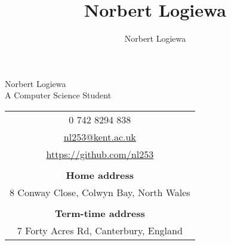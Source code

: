 \documentclass[a4paper, 13pt, draft]{article}
\author{Norbert Logiewa}
\title{Norbert Logiewa}
\begin{document}
\begin{center} \Huge{Norbert Logiewa} \\ \small{A Computer Science Student}  \end{center}

    \begin{table}[htpb]
	\centering
	\begin{tabular}{c}

	    0 742 8294 838 \\

	    \href{mailto:nl253@kent.ac.uk}{nl253@kent.ac.uk} \\

	    \href{https://github.com/nl253}{https://github.com/nl253} \\ \\

	    \textbf{Home address}\\ 
	    8 Conway Close, Colwyn Bay, North Wales \\ \\

	    \textbf{Term-time address} \\ 
	    7 Forty Acres Rd, Canterbury, England \\

	\end{tabular}
    \end{table}

    \section*{}
\end{document}
